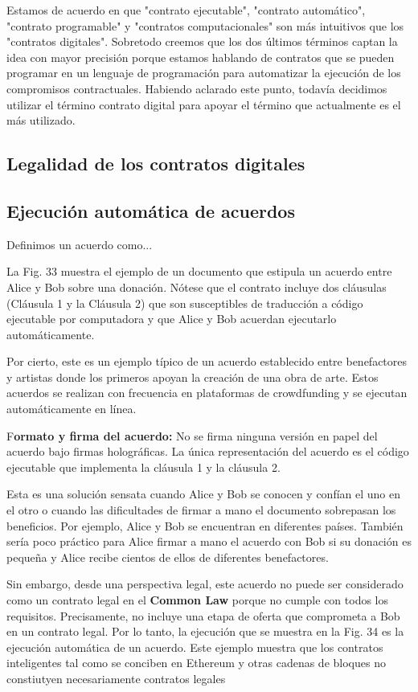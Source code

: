 \documentclass[12pt]{report} %
\begin{document}
\begin{itemize}
Estamos de acuerdo en que "contrato ejecutable", "contrato automático", "contrato programable" y "contratos computacionales" son más intuitivos que los "contratos digitales". Sobretodo creemos que los dos últimos términos captan la idea con mayor precisión porque estamos hablando de contratos que se pueden programar en un lenguaje de programación para automatizar la ejecución de los compromisos contractuales. Habiendo aclarado este punto, todavía decidimos utilizar el término contrato digital para apoyar el término que actualmente es el más utilizado.

\subsection{Legalidad de los contratos digitales}

\subsection{Ejecución automática de acuerdos}

Definimos un acuerdo como...

La Fig. 33 muestra el ejemplo de un documento que estipula un acuerdo entre Alice y Bob sobre una donación. Nótese que el contrato incluye dos cláusulas (Cláusula 1 y la Cláusula 2) que son susceptibles de traducción a código ejecutable por computadora y que Alice y Bob acuerdan ejecutarlo automáticamente.

Por cierto, este es un ejemplo típico de un acuerdo establecido entre benefactores y artistas donde los primeros apoyan la creación de una obra de arte. Estos acuerdos se realizan con frecuencia en plataformas de crowdfunding y se ejecutan automáticamente en línea.

F\textbf{ormato y firma del acuerdo:} No se firma ninguna versión en papel del acuerdo bajo firmas holográficas. La única representación del acuerdo es el código ejecutable que implementa la cláusula 1 y la cláusula 2.

Esta es una solución sensata cuando Alice y Bob se conocen y confían el uno en el otro o cuando las dificultades de firmar a mano el documento sobrepasan los beneficios. Por ejemplo, Alice y Bob se encuentran en diferentes países. También sería poco práctico para Alice firmar a mano el acuerdo con Bob si su donación es pequeña y Alice recibe cientos de ellos de diferentes benefactores.

Sin embargo, desde una perspectiva legal, este acuerdo no puede ser considerado como un contrato legal en el \textbf{Common Law} porque no cumple con todos los requisitos. Precisamente, no incluye una etapa de oferta que comprometa a Bob en un contrato legal. Por lo tanto, la ejecución que se muestra en la Fig. 34 es la ejecución automática de un acuerdo. Este ejemplo muestra que los contratos inteligentes tal como se conciben en Ethereum y otras cadenas de bloques no constiutyen necesariamente contratos legales


\end{itemize}
\end{document}
